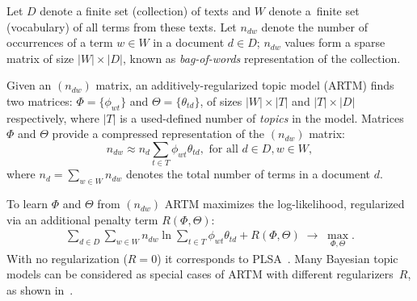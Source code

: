 \documentclass[russian,english]{llncs}
\newcommand{\norm}{\mathop{\rm norm}\limits}
\begin{document}
Let
$D$ denote a finite set (collection) of texts and
$W$ denote a~finite set (vocabulary) of all terms from these texts.
Let
$n_{dw}$ denote the number of occurrences of a term $w \in W$ in a document $d \in D$;
$n_{dw}$ values form a sparse matrix of size $|W| \times |D|$,
known as \emph{bag-of-words} representation of the collection.

Given an $(n_{dw})$ matrix, an additively-regularized topic model (ARTM) finds two matrices:
$\Phi = \{\phi_{wt}\}$ and $\Theta = \{\theta_{td}\}$,
of sizes $|W| \times |T|$ and $|T| \times |D|$ respectively,
where $|T|$ is a used-defined number of \emph{topics} in the model.
Matrices $\Phi$ and $\Theta$
provide a compressed representation of the $(n_{dw})$ matrix:
\[
n_{dw} \approx n_d \sum_{t \in T} \phi_{wt} \theta_{td}, \text { for all } d \in D, w \in W,
\]
where $n_d = \sum_{w \in W} n_{dw}$ denotes the total number of terms in a document $d$.

To learn $\Phi$ and $\Theta$ from $(n_{dw})$ ARTM maximizes
the log-likelihood, regularized via an additional penalty term $R(\Phi, \Theta)$:
\begin{gather}
\label{eq:ARTM}
    \sum_{d\in D}\sum_{w\in W} n_{dw} \ln \sum_{t\in T} \phi_{wt} \theta_{td} + R(\Phi, \Theta)
    \;\to\; \max_{\Phi,\Theta}.
\end{gather}
With no regularization (${R=0}$) it corresponds to PLSA~\cite{hofmann99plsi}.
Many Bayesian topic models can be considered
as special cases of ARTM with different regularizers~$R$,
as shown in~\cite{voron14mlj,voron14aist}.
\end{document}
